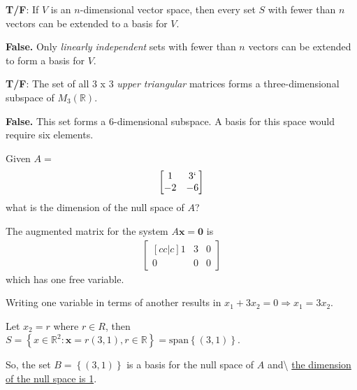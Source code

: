 \begin{problem}[?]

\textbf{T/F}: If \(V\) is an \(n\)-dimensional vector space, then every
set \(S\) with fewer than \(n\) vectors can be extended to a basis for
\(V\).

\end{problem}

\begin{solution}

\textbf{False.} Only \textit{linearly independent} sets with fewer than
\(n\) vectors can be extended to form a basis for \(V\).

\end{solution}

\begin{problem}[?]

\textbf{T/F}: The set of all 3 x 3 \textit{upper triangular} matrices
forms a three-dimensional subspace of \(M_{3}(\mathbb{R})\).

\end{problem}

\begin{solution}

\textbf{False.} This set forms a 6-dimensional subspace. A basis for
this space would require six elements.

\end{solution}

\begin{problem}[?]

Given \(A=\)
\begin{align*}\begin{bmatrix}
  1     & 3 `   \\
  -2    & -6
\end{bmatrix}\end{align*} what is the dimension of the null space of
\(A\)?

\end{problem}

\begin{solution}

The augmented matrix for the system \(A\mathbf{x} = \mathbf{0}\) is
\begin{align*}\begin{bmatrix}[cc|c]
1 & 3 & 0   \\
0 & 0 & 0
\end{bmatrix}\end{align*} which has one free variable.

Writing one variable in terms of another results in
\(x_1 + 3x_2 = 0 \Rightarrow x_1 = 3x_2\).

Let \(x_2 = r\) where \(r \in R\), then
\(S = \left\{ x \in \mathbb{R}^2 : \mathbf{x} = r(3,1), r \in \mathbb{R}\right\} = \text{span}\left\{(3,1)\right\}\).

So, the set \(B = \left\{(3,1)\right\}\) is a basis for the null space
of \(A\) and\textbackslash{}
\underline{the dimension of the null space is 1}.

\end{solution}

